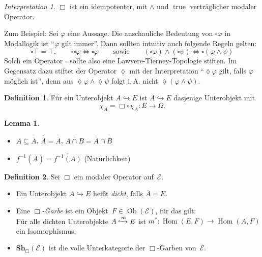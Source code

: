 \documentclass{article}
\theoremstyle{definition}
\newtheorem*{defn}{Definition}
\newtheorem*{lem}{Lemma}
\theoremstyle{remark}
\newtheorem*{interp}{Interpretation}
\newcommand{\?}{\,{:}\,}
\renewcommand{\_}{\mathpunct{.}\,}
\DeclareMathOperator{\Ob}{Ob} %
\DeclareMathOperator{\Hom}{Hom} %
\DeclareMathOperator{\true}{true} %
\newcommand{\clos}[1]{\overline{{#1}}} %
\newcommand{\Sh}{\mathbf{Sh}} %
\newcommand{\Eat}{\mathcal{E}} %
\begin{document}
\begin{interp}
  $\Box$ ist ein idempotenter, mit ${\wedge}$ und $\true$ verträglicher modaler Operator.

  Zum Beispiel: Sei $\varphi$ eine Aussage. Die anschauliche Bedeutung von $\square \varphi$ in Modallogik ist "`$\varphi$ gilt immer"'.
  Dann sollten intuitiv auch folgende Regeln gelten:
  \[
    \square \top = \top, \qquad
    \square \square \varphi \iff \square \varphi
    \qquad \text{sowie} \qquad
    (\square \varphi) \wedge (\square \psi) \iff \square (\varphi \wedge \psi)
  \]
  Solch ein Operator $\square$ sollte also eine Lawvere-Tierney-Topologie stiften.
  Im Gegensatz dazu stiftet der Operator $\lozenge$ mit der Interpretation "`$\lozenge \varphi$ gilt, falls $\varphi$ möglich ist"', denn aus $\lozenge \varphi \wedge \lozenge \psi$ folgt i.\,A. nicht $\lozenge (\varphi \wedge \psi)$.
\end{interp}

\begin{defn}
  Für ein Unterobjekt $A \hookrightarrow E$ ist $\clos{A} \hookrightarrow E$ dasjenige Unterobjekt mit
  \[ \chi_{\clos{A}} = \Box \circ \chi_A : E \to \Omega. \]
\end{defn}

\begin{lem}
  \begin{minipage}[t]{0.8 \linewidth}\begin{itemize}
    \item
      $A \subseteq \clos{A}$, \quad
      $\clos{\clos{A}} = \clos{A}$, \quad
      $\clos{A \cap B} = \clos{A} \cap \clos{B}$
    \item $f^{-1}(\clos{A}) = \clos{f^{-1}(A)}$ \enspace (Natürlichkeit) \qquad
  \end{itemize}\end{minipage}
\end{lem}

\begin{defn}
  Sei $\Box$ ein modaler Operator auf~$\Eat$.
  \begin{itemize}[itemsep=0pt]
    \item Ein Unterobjekt $A \hookrightarrow E$ heißt \emph{dicht}, falls $\clos{A} = E$.
    \item
      Eine \emph{$\Box$-Garbe} ist ein Objekt~$F \in \Ob(\Eat)$, für das gilt: \\
      Für alle dichten Unterobjekte $A \xhookrightarrow{m} E$ ist $m^* : \Hom(E, F) \to \Hom(A, F)$ ein Isomorphismus.
    \item $\Sh_\Box(\Eat)$ ist die volle Unterkategorie der $\Box$-Garben von~$\Eat$.
  \end{itemize}
\end{defn}
\end{document}
